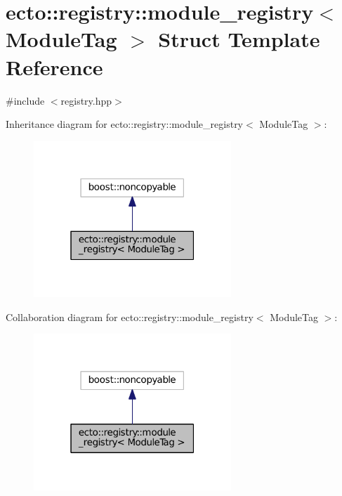 \hypertarget{structecto_1_1registry_1_1module__registry}{}\section{ecto\+:\+:registry\+:\+:module\+\_\+registry$<$ Module\+Tag $>$ Struct Template Reference}
\label{structecto_1_1registry_1_1module__registry}


{\ttfamily \#include $<$registry.\+hpp$>$}



Inheritance diagram for ecto\+:\+:registry\+:\+:module\+\_\+registry$<$ Module\+Tag $>$\+:\nopagebreak
\begin{figure}[H]
\begin{center}
\leavevmode
\includegraphics[width=211pt]{structecto_1_1registry_1_1module__registry__inherit__graph}
\end{center}
\end{figure}


Collaboration diagram for ecto\+:\+:registry\+:\+:module\+\_\+registry$<$ Module\+Tag $>$\+:\nopagebreak
\begin{figure}[H]
\begin{center}
\leavevmode
\includegraphics[width=211pt]{structecto_1_1registry_1_1module__registry__coll__graph}
\end{center}
\end{figure}
